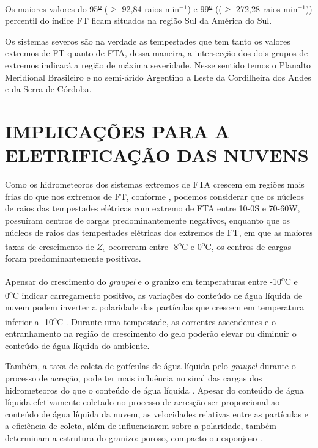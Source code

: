 Os maiores valores do 95\textsuperscript{\underline{o}} ($\geq$ 92,84 raios min$^{-1}$) e 99\textsuperscript{\underline{o}} (($\geq$ 272,28 raios min$^{-1}$)) percentil do índice FT ficam situados na região Sul da América do Sul.


Os sistemas severos são na verdade as tempestades que tem tanto os valores extremos de FT quanto de FTA, dessa maneira, a intersecção dos dois grupos de extremos indicará a região de máxima severidade. Nesse sentido temos o Planalto Meridional Brasileiro e no semi-árido Argentino a Leste da Cordilheira dos Andes e da Serra de Córdoba.



\section{IMPLICAÇÕES PARA A ELETRIFICAÇÃO DAS NUVENS}



Como os hidrometeoros dos sistemas extremos de FTA crescem em regiões mais frias do que nos extremos de FT,
conforme , podemos considerar que os núcleos de raios das tempestades elétricas com extremo de FTA entre 10-0S e 70-60W, possuíram centros de cargas predominantemente negativos, enquanto que os núcleos de raios das tempestades elétricas dos extremos de FT, em que as maiores taxas de crescimento de $Z_c$ ocorreram entre -8\textsuperscript{o}C e 0\textsuperscript{o}C, os centros de cargas foram predominantemente positivos.

Apensar do crescimento do \textit{graupel} e o granizo em temperaturas entre -10\textsuperscript{o}C e 0\textsuperscript{o}C indicar carregamento positivo, as variações do conteúdo de água líquida de nuvem  podem inverter a polaridade das partículas que crescem em temperatura inferior a -10\textsuperscript{o}C \cite{Takahashi1978}. Durante uma tempestade, as correntes ascendentes e o entranhamento na região de crescimento do gelo poderão elevar ou diminuir o conteúdo de água líquida do ambiente.

Também, a taxa de coleta de gotículas de água líquida pelo \textit{graupel} durante o processo de acreção, pode ter mais influência no sinal das cargas dos hidrometeoros do que o conteúdo de água líquida \cite{jayaratne1983,saunders1991effect,brooks1997,Takahashi2002}. 
Apesar do conteúdo de água líquida efetivamente coletado no processo de acresção ser proporcional ao conteúdo de água líquida da nuvem, as velocidades relativas entre as partículas e a eficiência de coleta, além de influenciarem sobre a polaridade, também determinam a estrutura do granizo: poroso, compacto ou esponjoso \cite[p.~335]{mason1971_2ed}.  
 
